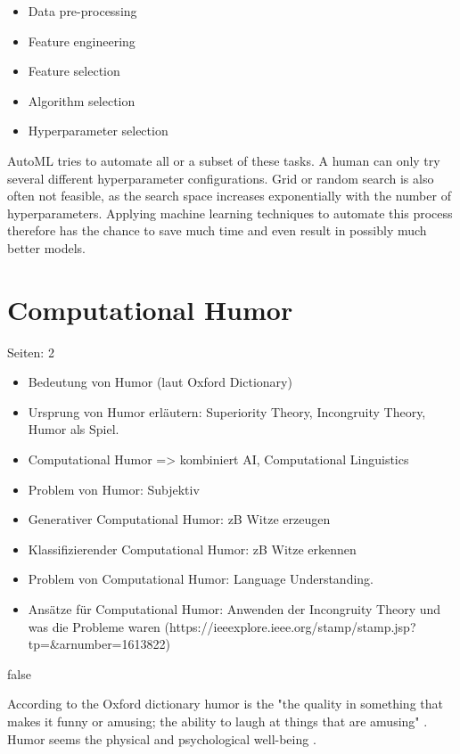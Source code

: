 \documentclass[draft,final,oneside]{vutinfth} %
\begin{document}
\begin{itemize}
\item Data pre-processing
\item Feature engineering
\item Feature selection
\item Algorithm selection
\item Hyperparameter selection
\end{itemize}

AutoML tries to automate all or a subset of these tasks. A human can only try several different hyperparameter configurations. Grid or random search is also often not feasible, as the search space increases exponentially with the number of hyperparameters. Applying machine learning techniques to automate this process therefore has the chance to save much time and even result in possibly much better models.


\fi

\section{Computational Humor}
Seiten: 2
\begin{itemize}
\item Bedeutung von Humor (laut Oxford Dictionary)
\item Ursprung von Humor erläutern: Superiority Theory, Incongruity Theory, Humor als Spiel.
\item Computational Humor => kombiniert AI, Computational Linguistics
\item Problem von Humor: Subjektiv
\item Generativer Computational Humor: zB Witze erzeugen
\item Klassifizierender Computational Humor: zB Witze erkennen
\item Problem von Computational Humor: Language Understanding.
\item Ansätze für Computational Humor: Anwenden der Incongruity Theory und was die Probleme waren (https://ieeexplore.ieee.org/stamp/stamp.jsp?tp=\&arnumber=1613822)
\end{itemize}

\if false

According to the Oxford dictionary humor is the "the quality in something that makes it funny or amusing; the ability to laugh at things that are amusing" \cite{humordef}. Humor seems the physical and psychological well-being \cite{humorhealthy}.
\end{document}
